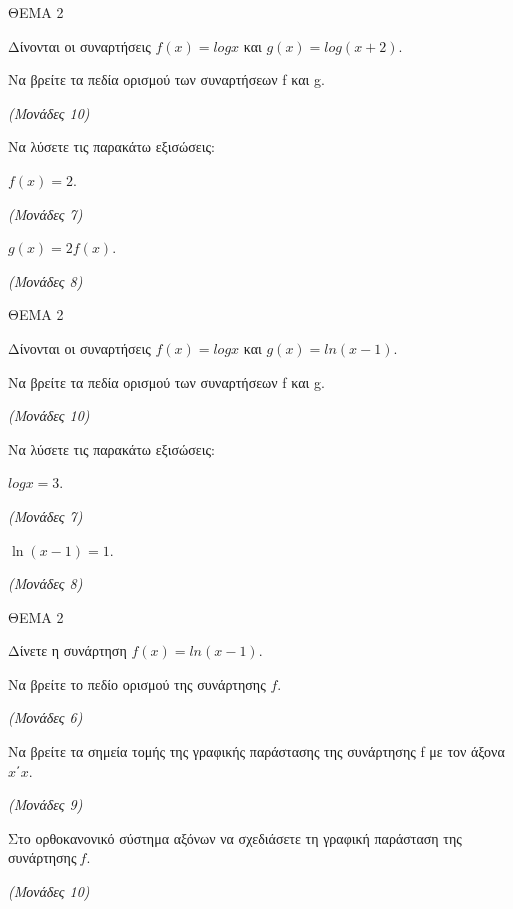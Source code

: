 \documentclass[11pt,a4paper,twoside]{book}
\newcommand{\monades}[1]{\hfill \textit{(Μονάδες #1)}}
\begin{document}
\vspace{4mm}

ΘΕΜΑ 2

Δίνονται οι συναρτήσεις $f(x) = logx$ και $g(x) = log(x + 2)$.

\begin{alist}
\item Να βρείτε τα πεδία ορισμού των συναρτήσεων f και g.

\monades{10}

\item Να λύσετε τις παρακάτω εξισώσεις:

\begin{rlist}
\item $f(x) = 2.$

\monades{7}

\item $g(x) = 2f(x).$

\monades{8}
\end{rlist}
\end{alist}

\vspace{4mm}

ΘΕΜΑ 2

Δίνονται οι συναρτήσεις $f(x) = logx$ και $g(x) = ln(x - 1)$.

\begin{alist}
\item Να βρείτε τα πεδία ορισμού των συναρτήσεων f και g.

\monades{10}

\item Να λύσετε τις παρακάτω εξισώσεις:

\begin{rlist}
\item $logx = 3.$

\monades{7}

\item $\ln(x - 1) = 1.$

\monades{8}
\end{rlist}
\end{alist}

\vspace{4mm}

ΘΕΜΑ 2

Δίνετε η συνάρτηση $f(x) = ln(x - 1)$.

\begin{alist}
\item Να βρείτε το πεδίο ορισμού της συνάρτησης $f$.

\monades{6}

\item Να βρείτε τα σημεία τομής της γραφικής παράστασης της συνάρτησης f με τον άξονα $x΄x.\ $

\monades{9}

\item Στο ορθοκανονικό σύστημα αξόνων να σχεδιάσετε τη γραφική παράσταση της συνάρτησης$\ f.$

\monades{10}
\end{alist}
\end{document}
